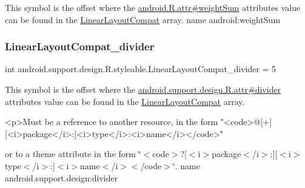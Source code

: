 This symbol is the offset where the \hyperlink{}{android.\+R.\+attr\#weight\+Sum} attribute\textquotesingle{}s value can be found in the \hyperlink{classandroid_1_1support_1_1design_1_1R_1_1styleable_a00b7e2da5bc1f659d80ac76716119713}{Linear\+Layout\+Compat} array.  name android\+:weight\+Sum \mbox{\label{classandroid_1_1support_1_1design_1_1R_1_1styleable_af717aeae3bc1ab1dd5fa67dd5dbcf7f4}} 
\subsubsection{\texorpdfstring{Linear\+Layout\+Compat\+\_\+divider}{LinearLayoutCompat\_divider}}
{\footnotesize\ttfamily int android.\+support.\+design.\+R.\+styleable.\+Linear\+Layout\+Compat\+\_\+divider = 5\hspace{0.3cm}{\ttfamily [static]}}

This symbol is the offset where the \hyperlink{classandroid_1_1support_1_1design_1_1R_1_1attr_aaec83d2f909bf7da00e50359ec0806ac}{android.\+support.\+design.\+R.\+attr\#divider} attribute\textquotesingle{}s value can be found in the \hyperlink{classandroid_1_1support_1_1design_1_1R_1_1styleable_a00b7e2da5bc1f659d80ac76716119713}{Linear\+Layout\+Compat} array.

\begin{DoxyVerb}      <p>Must be a reference to another resource, in the form "<code>@[+][<i>package</i>:]<i>type</i>:<i>name</i></code>"
\end{DoxyVerb}
 or to a theme attribute in the form \char`\"{}$<$code$>$?\mbox{[}$<$i$>$package$<$/i$>$\+:\mbox{]}\mbox{[}$<$i$>$type$<$/i$>$\+:\mbox{]}$<$i$>$name$<$/i$>$$<$/code$>$\char`\"{}.  name android.\+support.\+design\+:divider \mbox{\label{classandroid_1_1support_1_1design_1_1R_1_1styleable_ab9d976c9fc0ba16e05e50c57f510e043}} 
